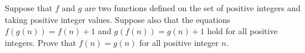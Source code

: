 Suppose that $f$ and $g$ are two functions defined on the set of positive integers and taking positive integer values. Suppose also that the equations $f(g(n)) = f(n) + 1$ and $g(f(n)) = g(n) + 1$ hold for all positive integers. Prove that $f(n) = g(n)$ for all positive integer $n.$